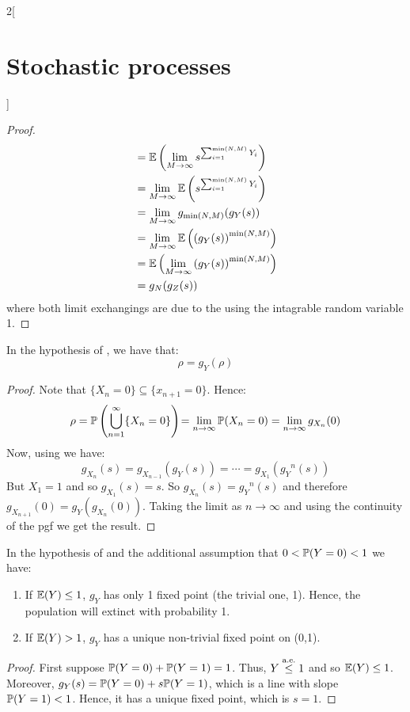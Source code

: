 \documentclass[../../../main_math.tex]{subfiles}
\begin{document}
\begin{multicols}{2}[\section{Stochastic processes}]
\begin{proof}
\begin{align*}
             & =\mathbb{E}\left(\lim_{M\to\infty}s^{\sum_{i=1}^{\min(N,M)}Y_i}\right) \\
             & =\lim_{M\to\infty}\mathbb{E}\left(s^{\sum_{i=1}^{\min(N,M)}Y_i}\right) \\
             & =\lim_{M\to\infty}g_{\min(N,M)}(g_Y(s))                          \\
             & =\lim_{M\to\infty}\mathbb{E}\left({(g_Y(s))}^{\min(N,M)}\right)        \\
             & =\mathbb{E}\left(\lim_{M\to\infty}{(g_Y(s))}^{\min(N,M)}\right)        \\
             & =g_N(g_Z(s))
    \end{align*}
    where both limit exchangings are due to the  using the intagrable random variable 1.
  \end{proof}
  \begin{theorem}
    In the hypothesis of , we have that: $$\rho=g_Y(\rho)$$
  \end{theorem}
  \begin{proof}
    Note that $\{X_n=0\}\subseteq \{x_{n+1}=0\}$. Hence:
    $$\rho=\mathbb{P}\left(\bigcup_{n=1}^\infty\{X_n=0\}\right)\!=\lim_{n\to\infty}\mathbb{P}(X_n=0)=\lim_{n\to\infty}g_{X_n}(0)$$
    Now, using  we have:
    $$g_{X_{n}}(s)=g_{X_{n-1}}(g_Y(s))=\cdots=g_{X_1}({g_Y}^n(s))$$
    But $X_1=1$ and so $g_{X_1}(s)=s$. So $g_{X_{n}}(s)={g_Y}^n(s)$ and therefore
    $g_{X_{n+1}}(0)=g_Y(g_{X_{n}}(0))$.
    Taking the limit as $n\to\infty$ and using the continuity of the pgf we get the result.
  \end{proof}
  \begin{theorem}
    In the hypothesis of  and the additional assumption that $0<\mathbb{P}(Y=0)<1$ we have:
    \begin{enumerate}
      \item If $\mathbb{E}(Y)\leq 1$, $g_Y$ has only 1 fixed point (the trivial one, 1). Hence, the population will extinct with probability 1.
      \item If $\mathbb{E}(Y)> 1$, $g_Y$ has a unique non-trivial fixed point on (0,1).
    \end{enumerate}
  \end{theorem}
  \begin{proof}
    First suppose $\mathbb{P}(Y=0)+\mathbb{P}(Y=1)=1$. Thus, $Y\overset{\text{a.e.}}{\leq}1$ and so $\mathbb{E}(Y)\leq 1$. Moreover, $g_Y(s)=\mathbb{P}(Y=0)+s\mathbb{P}(Y=1)$, which is a line with slope $\mathbb{P}(Y=1)<1$. Hence, it has a unique fixed point, which is $s=1$.


\end{proof}
\end{multicols}
\end{document}
